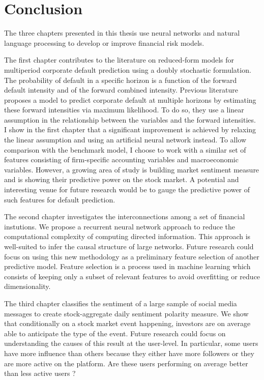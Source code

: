 \cleardoublepage
\chapter*{Conclusion}

The three chapters presented in this thesis use neural networks and natural language processing to develop or improve financial risk models.

The first chapter contributes to the literature on reduced-form models for multiperiod corporate default prediction using a doubly stochastic formulation. The probability of default in a specific horizon is a function of the forward default intensity and of the forward combined intensity. Previous literature proposes a model to predict corporate default at multiple horizons by estimating these forward intensities via maximum likelihood. To do so, they use a linear assumption in the relationship between the variables and the forward intensities. I show in the first chapter that a significant improvement is achieved by relaxing the linear assumption and using an artificial neural network instead. To allow comparison with the benchmark model, I choose to work with a similar set of features consisting of firm-specific accounting variables and macroeconomic variables. However, a growing area of study is building market sentiment measure and is showing their predictive power on the stock market. A potential and interesting venue for future research would be to gauge the predictive power of such features for default prediction. 

The second chapter investigates the interconnections among a set of financial instutions. We propose a recurrent neural network approach to reduce the computational complexity of computing directed information. This approach is well-suited to infer the causal structure of large networks. Future research could focus on using this new methodology as a preliminary feature selection of another predictive model. Feature selection is a process used in machine learning which consists of keeping only a subset of relevant features to avoid overfitting or reduce dimensionality.

The third chapter classifies the sentiment of a large sample of social media messages to create stock-aggregate daily sentiment polarity measure. We show that conditionally on a stock market event happening, investors are on average able to anticipate the type of the event. Future research could focus on understanding the causes of this result at the user-level. In particular, some users have more influence than others because they either have more followers or they are more active on the platform. Are these users performing on average better than less active users ?
